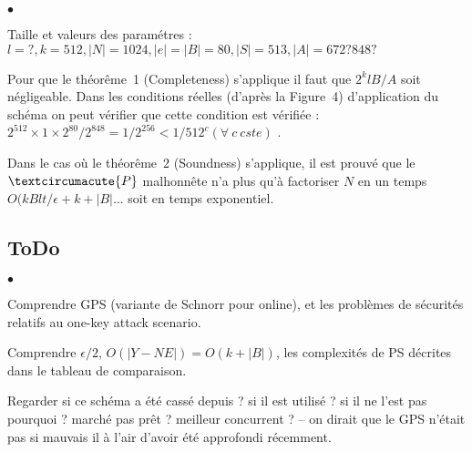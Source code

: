 \begin{list}{\texttt{$\bullet$}}{}
\item Taille et valeurs des paramétres : $l=? , k=512, |N|=1024, |e|=|B|=80, |S|=513, |A|=672?848?$
\item Pour que le théorême~1 (Completeness) s'applique il faut que $2^klB / A$ soit négligeable. Dans les conditions réelles (d'après la Figure~4) d'application du schéma on peut vérifier que cette condition est vérifiée : $2^{512}\times1\times2^{80}/2^{848} = 1/2^{256} < 1/512^c (\forall\ c\ cste)$ .
\item Dans le cas où le théorême~2 (Soundness) s'applique, il est prouvé que le $\textcircumacute{P}$ malhonnête n'a plus qu'à factoriser $N$ en un temps $O(kBlt/\epsilon + k + |B|$... soit en temps exponentiel. 
\end{list}



\subsection{ToDo}

\begin{list}{\texttt{$\bullet$}}{}
\item Comprendre GPS (variante de Schnorr pour online), et les problèmes de sécurités relatifs au one-key attack scenario.
\item Comprendre $\epsilon/2$, $O(|Y-NE|)=O(k+|B|)$, les complexités de PS décrites dans le tableau de comparaison.
\item Regarder si ce schéma a été cassé depuis ? si il est utilisé ? si il ne l'est pas pourquoi ? marché pas prêt ? meilleur concurrent ? -- on dirait que le GPS n'était pas si mauvais il à l'air d'avoir été approfondi récemment.
\end{list}
